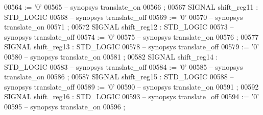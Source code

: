 \begin{DoxyCode}
{00564       \textcolor{vhdlchar}{:=} \textcolor{vhdlchar}{'}\textcolor{vhdllogic}{}\textcolor{vhdllogic}{0}\textcolor{vhdlchar}{'}
00565 \textcolor{keyword}{     -- synopsys translate\_on}
00566      ;
00567      \textcolor{keywordflow}{SIGNAL}  \textcolor{vhdlchar}{shift_reg11}    \textcolor{vhdlchar}{:}   \textcolor{comment}{STD\_LOGIC}
00568 \textcolor{keyword}{     -- synopsys translate\_off}
00569       \textcolor{vhdlchar}{:=} \textcolor{vhdlchar}{'}\textcolor{vhdllogic}{}\textcolor{vhdllogic}{0}\textcolor{vhdlchar}{'}
00570 \textcolor{keyword}{     -- synopsys translate\_on}
00571      ;
00572      \textcolor{keywordflow}{SIGNAL}  \textcolor{vhdlchar}{shift_reg12}    \textcolor{vhdlchar}{:}   \textcolor{comment}{STD\_LOGIC}
00573 \textcolor{keyword}{     -- synopsys translate\_off}
00574       \textcolor{vhdlchar}{:=} \textcolor{vhdlchar}{'}\textcolor{vhdllogic}{}\textcolor{vhdllogic}{0}\textcolor{vhdlchar}{'}
00575 \textcolor{keyword}{     -- synopsys translate\_on}
00576      ;
00577      \textcolor{keywordflow}{SIGNAL}  \textcolor{vhdlchar}{shift_reg13}    \textcolor{vhdlchar}{:}   \textcolor{comment}{STD\_LOGIC}
00578 \textcolor{keyword}{     -- synopsys translate\_off}
00579       \textcolor{vhdlchar}{:=} \textcolor{vhdlchar}{'}\textcolor{vhdllogic}{}\textcolor{vhdllogic}{0}\textcolor{vhdlchar}{'}
00580 \textcolor{keyword}{     -- synopsys translate\_on}
00581      ;
00582      \textcolor{keywordflow}{SIGNAL}  \textcolor{vhdlchar}{shift_reg14}    \textcolor{vhdlchar}{:}   \textcolor{comment}{STD\_LOGIC}
00583 \textcolor{keyword}{     -- synopsys translate\_off}
00584       \textcolor{vhdlchar}{:=} \textcolor{vhdlchar}{'}\textcolor{vhdllogic}{}\textcolor{vhdllogic}{0}\textcolor{vhdlchar}{'}
00585 \textcolor{keyword}{     -- synopsys translate\_on}
00586      ;
00587      \textcolor{keywordflow}{SIGNAL}  \textcolor{vhdlchar}{shift_reg15}    \textcolor{vhdlchar}{:}   \textcolor{comment}{STD\_LOGIC}
00588 \textcolor{keyword}{     -- synopsys translate\_off}
00589       \textcolor{vhdlchar}{:=} \textcolor{vhdlchar}{'}\textcolor{vhdllogic}{}\textcolor{vhdllogic}{0}\textcolor{vhdlchar}{'}
00590 \textcolor{keyword}{     -- synopsys translate\_on}
00591      ;
00592      \textcolor{keywordflow}{SIGNAL}  \textcolor{vhdlchar}{shift_reg16}    \textcolor{vhdlchar}{:}   \textcolor{comment}{STD\_LOGIC}
00593 \textcolor{keyword}{     -- synopsys translate\_off}
00594       \textcolor{vhdlchar}{:=} \textcolor{vhdlchar}{'}\textcolor{vhdllogic}{}\textcolor{vhdllogic}{0}\textcolor{vhdlchar}{'}
00595 \textcolor{keyword}{     -- synopsys translate\_on}
00596      ;
}
\end{DoxyCode}
